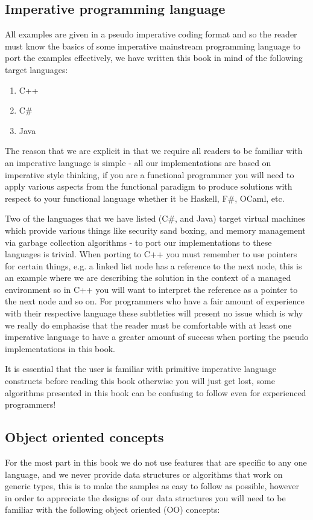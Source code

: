 \subsection{Imperative programming language}
All examples are given in a pseudo imperative coding format and so the reader must know the basics of some imperative mainstream programming language to port the examples effectively, we have written this book in mind of the following target languages:

\begin{enumerate}
\item C++
\item C\#
\item Java
\end{enumerate}

The reason that we are explicit in that we require all readers to be familiar with an imperative language is simple - all our implementations are based on imperative style thinking, if you are a functional programmer you will need to apply various aspects from the functional paradigm to produce solutions with respect to your functional language whether it be Haskell, F\#, OCaml, etc.


Two of the languages that we have listed (C\#, and Java) target virtual machines which provide various things like security sand boxing, and memory management via garbage collection algorithms - to port our implementations to these languages is trivial. When porting to C++ you must remember to use pointers for certain things, e.g. a linked list node has a reference to the next node, this is an example where we are describing the solution in the context of a managed environment so in C++ you will want to interpret the reference as a pointer to the next node and so on. For programmers who have a fair amount of experience with their respective language these subtleties will present no issue which is why we really do emphasise that the reader must be comfortable with at least one imperative language to have a greater amount of success when porting the pseudo implementations in this book.


It is essential that the user is familiar with primitive imperative language constructs before reading this book otherwise you will just get lost, some algorithms presented in this book can be confusing to follow even for experienced programmers!

\subsection{Object oriented concepts}
For the most part in this book we do not use features that are specific to any one language, and we never provide data structures or algorithms that work on generic types, this is to make the samples as easy to follow as possible, however in order to appreciate the designs of our data structures you will need to be familiar with the following object oriented (OO) concepts:

